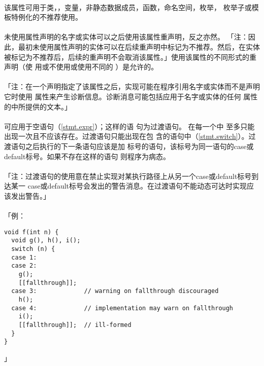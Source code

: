 \paragraph{}
该属性可用于类，，变量，非静态数据成员，函数，命名空间，枚举，
枚举子或模板特例化的不推荐使用。

\paragraph{}
未使用属性声明的名字或实体可以之后使用该属性重声明，反之亦然。
「注：因此，最初未使用属性声明的实体可以在后续重声明中标记为不推荐。然后，在实体
被标记为不推荐后，后续的重声明不会取消该属性。」使用该属性的不同形式的重声明（使
用或不使用或使用不同的
）是允许的。 

\paragraph{}
「注：在一个声明指定了该属性之后，实现可能在程序引用名字或实体而不是声明它时使用
属性来产生诊断信息。诊断消息可能包括应用于名字或实体的任何
属性的中所提供的文本。」

\paragraph{}
 可应用于空语句（\ref{stmt.expr}）；这样的语
句为过渡语句。 在每一个中
至多只能出现一次且不应该存在。过渡语句只能出现在包
含的语句中（\ref{stmt.switch}）。过渡语句之后执行的下一条语句应该是加
标号的语句，该标号为同一语句的case或default标号。如果不存在这样的语句
则程序为病态。

\paragraph{}
「注：过渡语句的使用意在禁止实现对某执行路径上从另一个case或default标号到达某一
case或default标号会发出的警告消息。在过渡语句不能动态可达时实现应该发出警告。」

\paragraph{}
「例：
\begin{lstlisting}
void f(int n) {
  void g(), h(), i();
  switch (n) {
  case 1:
  case 2:
    g();
    [[fallthrough]];
  case 3:             // warning on fallthrough discouraged
    h();
  case 4:             // implementation may warn on fallthrough
    i();
    [[fallthrough]];  // ill-formed
  }
}
\end{lstlisting}」

